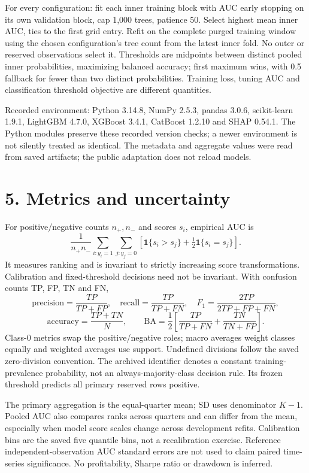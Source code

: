 \documentclass[11pt,a4paper]{article}
\begin{document}
For every configuration: fit each inner training block with AUC early stopping on its own validation block, cap 1,000 trees, patience 50. Select highest mean inner AUC, ties to the first grid entry. Refit on the complete purged training window using the chosen configuration's tree count from the latest inner fold. No outer or reserved observations select it. Thresholds are midpoints between distinct pooled inner probabilities, maximizing balanced accuracy; first maximum wins, with 0.5 fallback for fewer than two distinct probabilities. Training loss, tuning AUC and classification threshold objective are different quantities.



Recorded environment: Python 3.14.8, NumPy 2.5.3, pandas 3.0.6, scikit-learn 1.9.1, LightGBM 4.7.0, XGBoost 3.4.1, CatBoost 1.2.10 and SHAP 0.54.1. The Python modules preserve these recorded version checks; a newer environment is not silently treated as identical. The metadata and aggregate values were read from saved artifacts; the public adaptation does not reload models.

\clearpage
\section*{5. Metrics and uncertainty}
For positive/negative counts $n_+,n_-$ and scores $s_i$, empirical AUC is
\[
\frac1{n_+n_-}\sum_{i:y_i=1}\sum_{j:y_j=0}
\left[\mathbf1\{s_i>s_j\}+\tfrac12\mathbf1\{s_i=s_j\}\right].
\]
It measures ranking and is invariant to strictly increasing score transformations. Calibration and fixed-threshold decisions need not be invariant. With confusion counts TP, FP, TN and FN,
\[
\mathrm{precision}=\frac{TP}{TP+FP},\quad \mathrm{recall}=\frac{TP}{TP+FN},
\quad F_1=\frac{2TP}{2TP+FP+FN},
\]
\[
\mathrm{accuracy}=\frac{TP+TN}{N},\qquad
\mathrm{BA}=\frac12\left[\frac{TP}{TP+FN}+\frac{TN}{TN+FP}\right].
\]
Class-0 metrics swap the positive/negative roles; macro averages weight classes equally and weighted averages use support. Undefined divisions follow the saved zero-division convention. The archived identifier  denotes a constant training-prevalence probability, not an always-majority-class decision rule. Its frozen threshold predicts all primary reserved rows positive.

The primary aggregation is the equal-quarter mean; SD uses denominator $K-1$. Pooled AUC also compares ranks across quarters and can differ from the mean, especially when model score scales change across development refits. Calibration bins are the saved five quantile bins, not a recalibration exercise. Reference independent-observation AUC standard errors are not used to claim paired time-series significance. No profitability, Sharpe ratio or drawdown is inferred.
\end{document}
